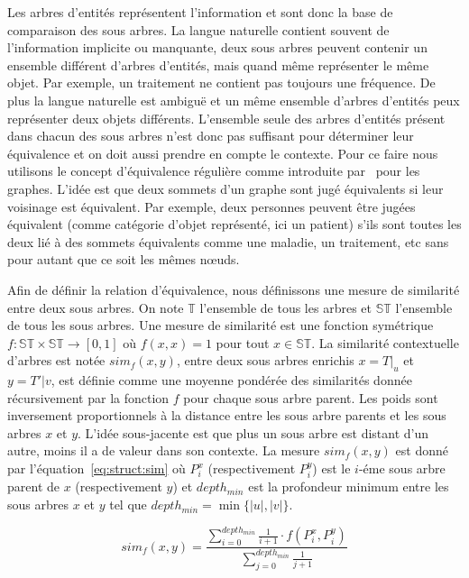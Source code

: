 Les arbres d'entités représentent l'information et sont donc la base de comparaison des sous arbres.
La langue naturelle contient souvent de l'information implicite ou manquante, deux sous arbres peuvent contenir un ensemble différent d'arbres d'entités, mais quand même représenter le même objet.
Par exemple, un traitement ne contient pas toujours une fréquence.
De plus la langue naturelle est ambiguë et un même ensemble d'arbres d'entités peux représenter deux objets différents.
L'ensemble seule des arbres d'entités présent dans chacun des sous arbres n'est donc pas suffisant pour déterminer leur équivalence et on doit aussi prendre en compte le contexte.
Pour ce faire nous utilisons le concept d'équivalence régulière comme introduite par~\cite{whiteGraphSemigroupHomomorphisms1983} pour les graphes.
L'idée est que deux sommets d'un graphe sont jugé équivalents si leur voisinage est équivalent.
Par exemple, deux personnes peuvent être jugées équivalent (comme catégorie d'objet représenté, ici un patient) s'ils sont toutes les deux lié à des sommets équivalents comme une maladie, un traitement, etc sans pour autant que ce soit les mêmes nœuds.

Afin de définir la relation d'équivalence, nous définissons une mesure de similarité entre deux sous arbres.
On note $\mathbb{T}$ l'ensemble de tous les arbres et $\mathbb{ST}$ l'ensemble de tous les sous arbres.
Une mesure de similarité est une fonction symétrique $f : \mathbb{ST} \times \mathbb{ST} \to [0,1]$ où $f(x, x) = 1$ pour tout $x \in \mathbb{ST}$.
La similarité contextuelle d'arbres est notée $sim_f(x, y)$, entre deux sous arbres enrichis $x = T|_u$ et $y = T'|v$, est définie comme une moyenne pondérée des similarités donnée récursivement par la fonction $f$ pour chaque sous arbre parent.
Les poids sont inversement proportionnels à la distance entre les sous arbre parents et les sous arbres $x$ et $y$.
L'idée sous-jacente est que plus un sous arbre est distant d'un autre, moins il a de valeur dans son contexte.
La mesure $sim_f(x, y)$ est donné par l'équation~\ref{eq:struct:sim} où $P^x_i$ (respectivement $P^y_i$) est le $i$-éme sous arbre parent de $x$ (respectivement $y$) et $depth_{min}$ est la profondeur minimum entre les sous arbres $x$ et $y$ tel que $depth_{min} = \min\{|u|, |v|\}$.

\begin{equation}
    sim_f(x, y) = \frac{\sum_{i=0}^{depth_{min}} \frac{1}{i + 1} \cdot f(P^x_i, P^y_i)}{\sum_{j=0}^{depth_{min}} \frac{1}{j + 1}} \label{eq:struct:sim}
\end{equation}

